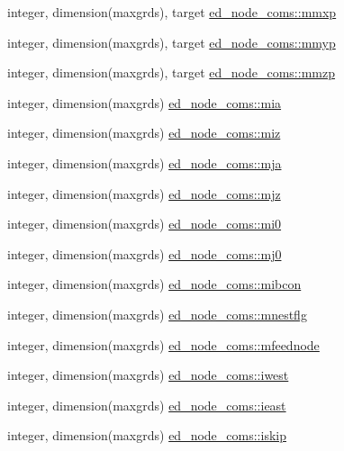 \begin{DoxyCompactItemize}
integer, dimension(maxgrds), target \hyperlink{namespaceed__node__coms_a0a26786e048c93181d52c25d73142af6}{ed\+\_\+node\+\_\+coms\+::mmxp}
\item 
integer, dimension(maxgrds), target \hyperlink{namespaceed__node__coms_a79783fa824eaca254de5ceb5273f1ff2}{ed\+\_\+node\+\_\+coms\+::mmyp}
\item 
integer, dimension(maxgrds), target \hyperlink{namespaceed__node__coms_a9384e8659a53635a2fbec99d3b3ca02f}{ed\+\_\+node\+\_\+coms\+::mmzp}
\item 
integer, dimension(maxgrds) \hyperlink{namespaceed__node__coms_aa872e042de37a4d54f239c536576fa3a}{ed\+\_\+node\+\_\+coms\+::mia}
\item 
integer, dimension(maxgrds) \hyperlink{namespaceed__node__coms_a84a2e967ef52e0e39e711d4eef30683e}{ed\+\_\+node\+\_\+coms\+::miz}
\item 
integer, dimension(maxgrds) \hyperlink{namespaceed__node__coms_a7c23d30331ab985adf33e7e0abaca9d7}{ed\+\_\+node\+\_\+coms\+::mja}
\item 
integer, dimension(maxgrds) \hyperlink{namespaceed__node__coms_aa271449af5bbb67875d63c1c3a974905}{ed\+\_\+node\+\_\+coms\+::mjz}
\item 
integer, dimension(maxgrds) \hyperlink{namespaceed__node__coms_ac0ed536bf855d993b1468e7313b63c56}{ed\+\_\+node\+\_\+coms\+::mi0}
\item 
integer, dimension(maxgrds) \hyperlink{namespaceed__node__coms_ad774b942f26ad9d0946e2b3be5e69851}{ed\+\_\+node\+\_\+coms\+::mj0}
\item 
integer, dimension(maxgrds) \hyperlink{namespaceed__node__coms_af8cf428b242766c5d3114bd5053ce26d}{ed\+\_\+node\+\_\+coms\+::mibcon}
\item 
integer, dimension(maxgrds) \hyperlink{namespaceed__node__coms_a9c6d2d73db66ee337e0d7a9b213b05d2}{ed\+\_\+node\+\_\+coms\+::mnestflg}
\item 
integer, dimension(maxgrds) \hyperlink{namespaceed__node__coms_a5de467657a345cda5f1b8bdd83cb8cb4}{ed\+\_\+node\+\_\+coms\+::mfeednode}
\item 
integer, dimension(maxgrds) \hyperlink{namespaceed__node__coms_a799bc57708f0eade1e7c33bfed33deea}{ed\+\_\+node\+\_\+coms\+::iwest}
\item 
integer, dimension(maxgrds) \hyperlink{namespaceed__node__coms_a6aa981e6ec7f7d2b2aea7f3b372fadc9}{ed\+\_\+node\+\_\+coms\+::ieast}
\item 
integer, dimension(maxgrds) \hyperlink{namespaceed__node__coms_aa0b58de3ae40a5b1f807eeb1183579f9}{ed\+\_\+node\+\_\+coms\+::iskip}

\end{DoxyCompactItemize}
